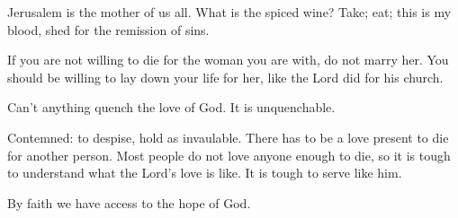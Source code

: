 \documentclass[12pt]{article}
\begin{document}
	\begin{quote}
		\BiblePsalmTwoTwelve{}
	\end{quote}

	Jerusalem is the mother of us all. What is the spiced wine?
	Take; eat; this is my blood, shed for the remission of sins.

	If you are not willing to die for the woman you are with, do
	not marry her. You should be willing to lay down your life for
	her, like the Lord did for his church.

	\begin{quote}
		\BibleSongOfSolomonEightSeven{}
	\end{quote}

	Can't anything quench the love of God. It is unquenchable.

	Contemned: to despise, hold as invaulable. There has to be
	a love present to die for another person. Most people do
	not love anyone enough to die, so it is tough to understand
	what the Lord's love is like. It is tough to serve like him.

	By faith we have access to the hope of God.

	\begin{quote}
		\BibleRomansFiveFive{}
	\end{quote}
\end{document}
